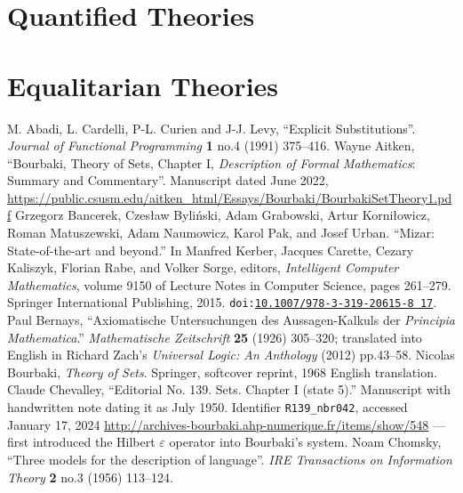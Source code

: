 \documentclass{amsart}
\begin{document}
\section{Quantified Theories}





\section{Equalitarian Theories}


\begin{thebibliography}{99}
  M. Abadi, L. Cardelli, P-L. Curien and J-J. Levy,
  ``Explicit Substitutions''.
  \textit{Journal of Functional Programming} \textbf{1} no.4 (1991) 375--416.
 Wayne Aitken,
  ``Bourbaki, Theory of Sets, Chapter I, \textit{Description of Formal Mathematics}: Summary and Commentary''.
  Manuscript dated June 2022,
  \url{https://public.csusm.edu/aitken_html/Essays/Bourbaki/BourbakiSetTheory1.pdf}
 Grzegorz Bancerek, Czesław Byli\'{n}ski, Adam Grabowski, Artur Korni\l{}owicz, Roman Matuszewski, Adam Naumowicz, Karol Pak, and Josef Urban.
  ``Mizar: State-of-the-art and beyond.''
  In Manfred Kerber, Jacques Carette, Cezary Kaliszyk, Florian Rabe, and Volker Sorge, editors, \textit{Intelligent Computer Mathematics}, volume 9150 of Lecture Notes in Computer Science, pages 261--279. Springer International Publishing, 2015. \texttt{doi:\href{http://dx.doi.org/10.1007/978-3-319-20615-8_17}{10.1007/978-3-319-20615-8 17}}.
 Paul Bernays, ``Axiomatische Untersuchungen des
Aussagen-Kalkuls der \textit{Principia Mathematica}.''
\textit{Mathematische Zeitschrift} \textbf{25} (1926) 305--320;
translated into English in Richard Zach's \textit{Universal Logic: An
  Anthology} (2012) pp.43--58.
 Nicolas Bourbaki,
  \textit{Theory of Sets}.
  Springer, softcover reprint, 1968 English translation.
  Claude Chevalley, ``Editorial No. 139. Sets. Chapter I (state 5).''
  Manuscript with handwritten note dating it as July 1950.
  Identifier \verb#R139_nbr042#, accessed January 17, 2024 \url{http://archives-bourbaki.ahp-numerique.fr/items/show/548}
  --- first introduced the Hilbert $\varepsilon$ operator into Bourbaki's system.
  Noam Chomsky,
  ``Three models for the description of language''.
  \textit{IRE Transactions on Information Theory} \textbf{2} no.3 (1956) 113--124.

\end{thebibliography}
\end{document}
